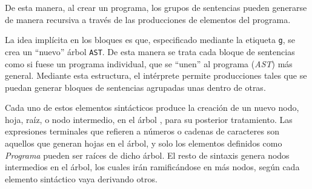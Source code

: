 \documentclass[12pt]{article}
\begin{document}
De esta manera, al crear un programa, los grupos de sentencias pueden generarse de manera recursiva a través de las producciones de elementos del programa.
\par
La idea implícita en los bloques es que, especificado mediante la etiqueta \texttt{g}, se crea un ``nuevo'' árbol \texttt{AST}. De esta manera se trata cada bloque de sentencias como si fuese un programa individual, que se ``unen'' al programa (\textit{AST}) más general. Mediante esta estructura, el intérprete permite producciones tales que se puedan generar bloques de sentencias agrupadas unas dentro de otras.
\par
Cada uno de estos elementos sintácticos produce la creación de un nuevo nodo, hoja, raíz, o nodo intermedio, en el árbol , para su posterior tratamiento. Las expresiones terminales que refieren a números o cadenas de caracteres son aquellos que generan hojas en el árbol, y solo los elementos definidos como \textit{Programa} pueden ser raíces de dicho árbol. El resto de sintaxis genera nodos intermedios en el árbol, los cuales irán ramificándose en más nodos, según cada elemento sintáctico vaya derivando otros.
\par
\end{document}
